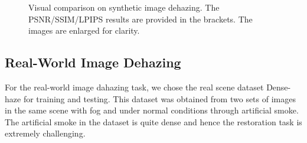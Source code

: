 \documentclass[10pt,journal,compsoc]{IEEEtran}
\begin{document}
\begin{figure}[!t]
	\centering
	\caption{Visual comparison on synthetic image dehazing. The PSNR/SSIM/LPIPS results are provided in the brackets. The images are enlarged for clarity.}
	\label{figure6}
\end{figure}


\subsection{Real-World Image Dehazing}

For the real-world image dahazing task, 
we chose the real scene dataset Dense-haze \cite{dense} for training and testing. 
This dataset was obtained from two sets of images in the same scene 
with fog and under normal conditions through artificial smoke. 
The artificial smoke in the dataset is quite dense and hence the 
restoration task is extremely challenging.
\end{document}

